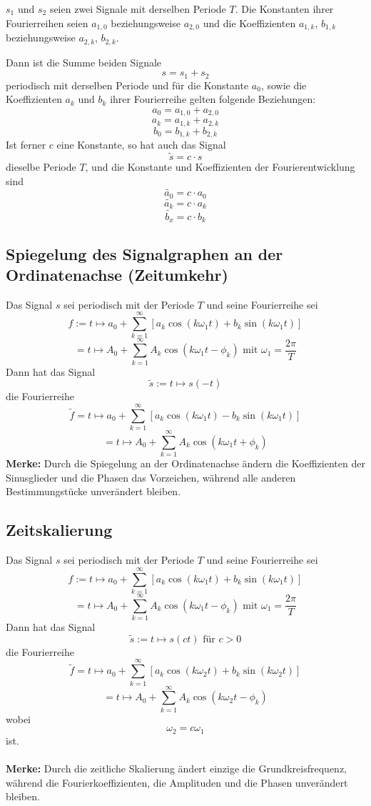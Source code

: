 \documentclass[10pt,a4paper]{scrartcl}
\begin{document}
$s_1$ und $s_2$ seien zwei Signale mit derselben Periode $T$. Die Konstanten
ihrer Fourierreihen seien $a_{1,0}$ beziehungsweise $a_{2,0}$ und die
Koeffizienten $a_{1,k}$, $b_{1,k}$ beziehungsweise $a_{2,k}$, $b_{2,k}$.

Dann ist die Summe beiden Signale
$$s = s_1 + s_2$$
periodisch mit derselben Periode und für die Konstante $a_0$, sowie die
Koeffizienten $a_k$ und $b_k$ ihrer Fourierreihe gelten folgende Beziehungen:
$$a_0 = a_{1,0} + a_{2,0}$$
$$a_k = a_{1,k} + a_{2,k}$$
$$b_0 = b_{1,k} + b_{2,k}$$
Ist ferner $c$ eine Konstante, so hat auch das Signal
$$\tilde{s} = c \cdot s$$
dieselbe Periode $T$, und die Konstante und Koeffizienten der
Fourierentwicklung sind
$$\tilde{a_0} = c \cdot a_0$$
$$\tilde{a_k} = c \cdot a_k$$
$$\tilde{b_x} = c \cdot b_k$$


\subsection{Spiegelung des Signalgraphen an der Ordinatenachse (Zeitumkehr)}

Das Signal $s$ sei periodisch mit der Periode $T$ und seine Fourierreihe sei
$$f:= t \mapsto a_0 + \sum_{k=1}^{\infty} \left[a_k\cos(k\omega_1t) + b_k\sin(k\omega_1t)\right]$$
$$= t \mapsto A_0 + \sum_{k=1}^{\infty} A_k \cos(k\omega_1t - \phi_k) \textrm{ mit } \omega_1 = \frac{2\pi}{T}$$
Dann hat das Signal
$$\tilde{s} := t \mapsto s(-t)$$
die Fourierreihe
$$\tilde{f} = t \mapsto a_0 + \sum_{k=1}^{\infty} \left[a_k \cos(k\omega_1t) - b_k\sin(k\omega_1t)\right]$$
$$= t \mapsto A_0 + \sum_{k=1}^{\infty} A_k\cos(k\omega_1t + \phi_k)$$
\textbf{Merke:} Durch die Spiegelung an der Ordinatenachse ändern die Koeffizienten der Sinusglieder
und die Phasen das Vorzeichen, während alle anderen Bestimmungstücke unverändert bleiben.


\subsection{Zeitskalierung}

Das Signal $s$ sei periodisch mit der Periode $T$ und seine Fourierreihe sei
$$f:= t \mapsto a_0 + \sum_{k=1}^{\infty} \left[a_k\cos(k\omega_1t) + b_k\sin(k\omega_1t)\right]$$
$$= t \mapsto A_0 + \sum_{k=1}^{\infty} A_k \cos(k\omega_1t - \phi_k) \textrm{ mit } \omega_1 = \frac{2\pi}{T}$$
Dann hat das Signal
$$\tilde{s} := t \mapsto s(ct) \textrm{ für } c > 0$$
die Fourierreihe
$$\tilde{f} = t \mapsto a_0 + \sum_{k=1}^{\infty} \left[a_k \cos(k\omega_2t) + b_k\sin(k\omega_2t)\right]$$
$$= t \mapsto A_0 + \sum_{k=1}^{\infty} A_k\cos(k\omega_2t - \phi_k)$$
wobei
$$\omega_2 = c\omega_1$$
ist.\\\\
\textbf{Merke:} Durch die zeitliche Skalierung ändert einzige die Grundkreisfrequenz,
während die Fourierkoeffizienten, die Amplituden und die Phasen unverändert bleiben.
\end{document}
